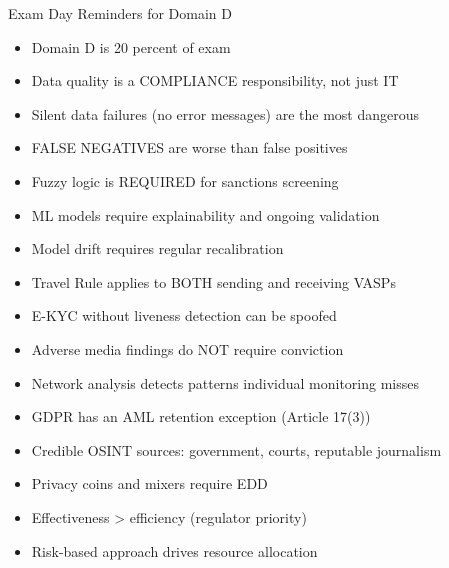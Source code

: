 \documentclass[11pt,a4paper]{beamer}
\begin{document}
\begin{frame}{Exam Day Reminders for Domain D}
	\begin{itemize}
		\item Domain D is 20 percent of exam
		\item Data quality is a COMPLIANCE responsibility, not just IT
		\item Silent data failures (no error messages) are the most dangerous
		\item FALSE NEGATIVES are worse than false positives
		\item Fuzzy logic is REQUIRED for sanctions screening
		\item ML models require explainability and ongoing validation
		\item Model drift requires regular recalibration
		\item Travel Rule applies to BOTH sending and receiving VASPs
		\item E-KYC without liveness detection can be spoofed
		\item Adverse media findings do NOT require conviction
		\item Network analysis detects patterns individual monitoring misses
		\item GDPR has an AML retention exception (Article 17(3))
		\item Credible OSINT sources: government, courts, reputable journalism
		\item Privacy coins and mixers require EDD
		\item Effectiveness > efficiency (regulator priority)
		\item Risk-based approach drives resource allocation
	\end{itemize}
	\vspace{0.3cm}

\end{frame}
\end{document}
